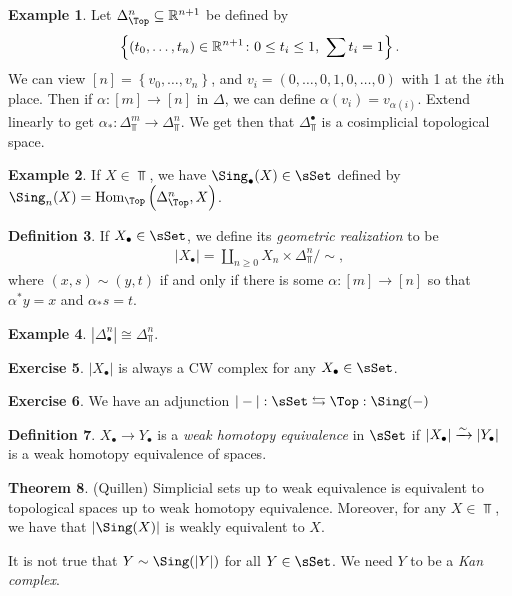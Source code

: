 \documentclass[12pt]{amsart}
\theoremstyle{definition}
\newtheorem{theorem}{Theorem}[section]
\newtheorem{definition}[theorem]{Definition}
\newtheorem{example}[theorem]{Example}
\newtheorem{exercise}[theorem]{Exercise}
\begin{document}
\begin{example} Let $\Delta^n_\Top \subseteq \R^{n+1}$ be defined by
\begin{align*}
    \left\{ (t_0, \ldots, t_n) \in \R^{n+1} \colon 0 \le t_i \le 1,\ \sum t_i = 1 \right\}.
\end{align*}
We can view $[n] = \left\{ v_0, \ldots, v_n \right\}$, and $v_i = (0, \ldots, 0,1,0, \ldots, 0)$ with 1 at the $i$th place. Then if $\alpha : [m] \to [n]$ in $\Delta$, we can define $\alpha(v_i) =v_{\alpha(i)}$. Extend linearly to get $\alpha_\ast : \Delta^m_\Top \to \Delta^n_\Top$. We get then that $\Delta^\bullet_\Top$ is a cosimplicial topological space.
\end{example}

\begin{example} If $X \in \Top$, we have $\Sing_\bullet(X) \in \sSet$ defined by $\Sing_n(X) = \Hom_\Top \left( \Delta_\Top^n, X \right)$.
\end{example}

\begin{definition} If $X_\bullet \in \sSet$, we define its \textit{geometric realization} to be
\begin{align*}
    |X_\bullet| = \amalg_{n\ge 0} X_n \times \Delta^n_\Top / \sim,
\end{align*}
where $(x,s)\sim (y,t)$ if and only if there is some $\alpha : [m] \to [n]$ so that $\alpha^\ast y = x$ and $\alpha_\ast s = t$.
\end{definition}


\begin{example} $|\Delta^n_\bullet| \cong \Delta^n_\Top$.
\end{example}

\begin{exercise} $|X_\bullet|$ is always a CW complex for any $X_\bullet \in \sSet$.
\end{exercise}

\begin{exercise} We have an adjunction $|-| : \sSet \leftrightarrows \Top: \Sing(-)$
\end{exercise}

\begin{definition} $X_\bullet \to Y_\bullet$ is a \textit{weak homotopy equivalence} in $\sSet$ if $|X_\bullet| \xrightarrow{\sim} |Y_\bullet|$ is a weak homotopy equivalence of spaces.
\end{definition}

\begin{theorem} (Quillen) Simplicial sets up to weak equivalence is equivalent to topological spaces up to weak homotopy equivalence. Moreover, for any $X\in \Top$, we have that $|\Sing(X)|$ is weakly equivalent to $X$.
\end{theorem}

It is not true that $Y \sim \Sing(|Y|)$ for all $Y \in \sSet$. We need $Y$ to be a \textit{Kan complex}.



\newpage

{}
\end{document}
